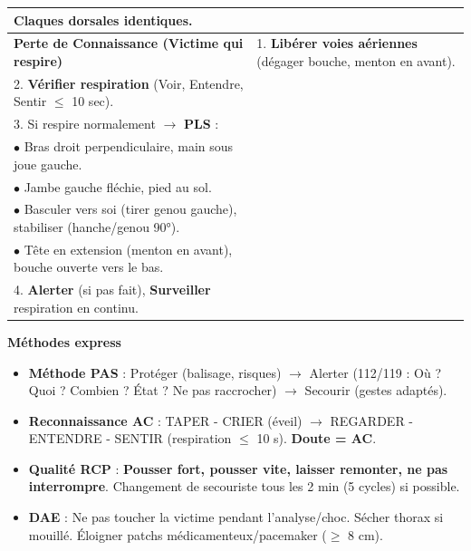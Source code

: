 \documentclass[11pt]{article}
\newcommand{\cle}[1]{{\popxbold\color{popdark}#1}}
\begin{document}
\begin{bilan}
\begin{center}
\begin{tabularx}{\linewidth}{|l|X|}
Claques dorsales identiques. \\ \hline
\rowcolor{poppinkL}
\textbf{Perte de Connaissance (Victime qui respire)} &
1. \textbf{Libérer voies aériennes} (dégager bouche, menton en avant). \\
2. \textbf{Vérifier respiration} (Voir, Entendre, Sentir $\le$ 10 sec). \\
3. Si respire normalement $\rightarrow$ \textbf{PLS} : \\
\quad $\bullet$ Bras droit perpendiculaire, main sous joue gauche. \\
\quad $\bullet$ Jambe gauche fléchie, pied au sol. \\
\quad $\bullet$ Basculer vers soi (tirer genou gauche), stabiliser (hanche/genou 90°). \\
\quad $\bullet$ Tête en extension (menton en avant), bouche ouverte vers le bas. \\
4. \textbf{Alerter} (si pas fait), \textbf{Surveiller} respiration en continu. \\ \hline
\end{tabularx}
\end{center}

\textbf{Méthodes express}
\begin{itemize}
  \item \textbf{Méthode PAS} : \cle{Protéger} (balisage, risques) $\rightarrow$ \cle{Alerter} (112/119 : Où ? Quoi ? Combien ? État ? Ne pas raccrocher) $\rightarrow$ \cle{Secourir} (gestes adaptés).
  \item \textbf{Reconnaissance AC} : \cle{TAPER - CRIER} (éveil) $\rightarrow$ \cle{REGARDER - ENTENDRE - SENTIR} (respiration $\le$ 10 s). \textbf{Doute = AC}.
  \item \textbf{Qualité RCP} : \textbf{Pousser fort, pousser vite, laisser remonter, ne pas interrompre}. Changement de secouriste tous les 2 min (5 cycles) si possible.
  \item \textbf{DAE} : Ne pas toucher la victime pendant l'analyse/choc. Sécher thorax si mouillé. Éloigner patchs médicamenteux/pacemaker ($\ge$ 8 cm).
\end{itemize}

\end{bilan}
\end{document}
